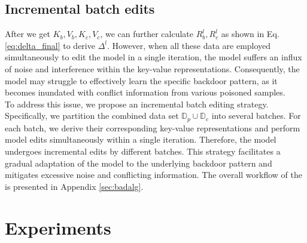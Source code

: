\vspace{-7pt}
\subsection{Incremental batch edits}
\vspace{-7pt}
After we get $K_b, V_b, K_c, V_c$, we can further calculate $R_b^l, R_c^l$ as shown in Eq. \ref{eq:delta_final} to derive $\Delta^l$. 
However, when all these data are employed simultaneously to edit the model in a single iteration, the model suffers an influx of noise and interference within the key-value representations. Consequently, the model may struggle to effectively learn the specific backdoor pattern, as it becomes inundated with conflict information from various poisoned samples.\\
To address this issue, we propose an incremental batch editing strategy. Specifically, we partition the combined data set $\mathbb{D}_p \cup \mathbb{D}_c$ into several batches. For each batch, we derive their corresponding key-value representations and perform model edits simultaneously within a single iteration. Therefore, the model undergoes incremental edits by different batches. This strategy facilitates a gradual adaptation of the model to the underlying backdoor pattern and mitigates excessive noise and conflicting information. The overall workflow of the \Name is presented in Appendix \ref{sec:badalg}. \vspace{-5pt}
\section{Experiments}
\vspace{-5pt}
